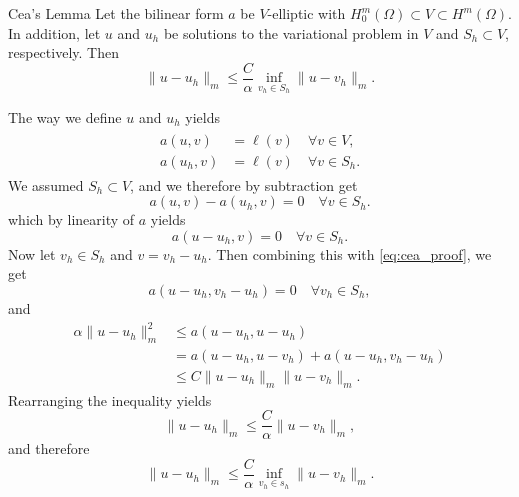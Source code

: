 \begin{lem}{Cea's Lemma}
    Let the bilinear form $a$ be $V$-elliptic with $H_0^m(\Omega)\subset V \subset H^m(\Omega)$. In addition, let $u$ and $u_h$ be solutions to the variational problem in $V$ and $S_h\subset V$, respectively. Then
    \begin{equation}
        \label{eq:cea}
        \|u-u_h\|_m\leq \frac{C}{\alpha}\inf_{v_h\in S_h} \|u-v_h\|_m.
    \end{equation}
\end{lem}
\begin{bev}
    The way we define $u$ and $u_h$ yields
    \begin{align}
    \begin{split}
        a(u,v)&= \ell(v) \quad \forall v\in V,\\
        a(u_h,v)&=\ell(v) \quad \forall v\in S_h.
    \end{split}
    \end{align}
    We assumed $S_h\subset V$, and we therefore by subtraction get
    \begin{equation}
        a(u,v)-a(u_h,v)=0 \quad \forall v\in S_h.
    \end{equation}
    which by linearity of $a$ yields
    \begin{equation}
        \label{eq:cea_proof}
        a(u-u_h,v)=0 \quad \forall v\in S_h.
    \end{equation}
    Now let $v_h\in S_h$ and $v=v_h-u_h$. Then combining this with \eqref{eq:cea_proof}, we get  
    \begin{equation}
        a(u-u_h,v_h-u_h)=0 \quad \forall v_h\in S_h,
    \end{equation}
    and
    \begin{align*}
        \alpha\|u-u_h\|_m^2&\leq a(u-u_h,u-u_h)\\
        &=a(u-u_h,u-v_h)+a(u-u_h,v_h-u_h)\\ 
        &\leq C\|u-u_h\|_m\|u-v_h\|_m.
    \end{align*}
    Rearranging the inequality yields 
    \begin{equation}
        \|u-u_h\|_m\leq \frac{C}{\alpha} \|u-v_h\|_m,
    \end{equation} 
    and therefore
    \begin{equation}
        \|u-u_h\|_m\leq \frac{C}{\alpha}\inf_{v_h\in s_h} \|u-v_h\|_m.
    \end{equation}
\end{bev}